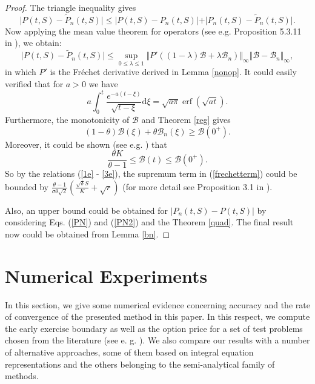 \documentclass[fleqn,final,3p,11pt]{elsarticle}
\theoremstyle{definition}
\theoremstyle{remark}
\numberwithin{equation}{section}
\DeclareMathOperator{\erf}{erf}
\begin{document}
\begin{proof}
The triangle inequality gives
\[
\vert P(t, S) - \tilde{P}_{n}(t, S) \vert \leq \vert P(t, S) - P_{n}(t, S) \vert + \vert P_{n}(t, S) - \tilde{P}_{n}(t, S) \vert.
 \]
Now applying the mean value theorem for operators (see e.g. Proposition 5.3.11 in \cite{atkinson}), we obtain:
 \begin{equation}\label{frechetterm}
 \vert P(t, S) - \tilde{P}_{n}(t, S) \vert\leq \sup_{0 \leq \lambda \leq 1} \Vert P'((1- \lambda)\mathcal{B} + \lambda \mathcal{B}_{n}) \Vert_{\infty} \Vert \mathcal{B} - \mathcal{B}_{n} \Vert_{\infty},\end{equation}
in which $P'$ is the Fr\'{e}chet derivative derived in Lemma \ref{nonop}.  It could easily verified that for $a> 0$ we have
\begin{equation}\label{1e} a \int_{0}^{t} \frac{e^{-a(t- \xi)}}{\sqrt{t -\xi}}\mathrm{d}\xi = \sqrt{a \pi} \erf (\sqrt{a t}).\end{equation}
Furthermore, the monotonicity of $\mathcal{B}$  and Theorem \ref{reg} gives
 \begin{equation}\label{2e} (1-\theta)\mathcal{B}(\xi) + \theta \mathcal{B}_{n}(\xi) \geq \mathcal{B}(0^{+}). \end{equation}
Moreover, it could be shown (see e.g. \cite{kim}) that
 \begin{equation}\label{3e}\frac{\theta K}{\theta -1 } \leq \mathcal{B}(t) \leq \mathcal{B}(0^{+}). \end{equation}
 So by the relations (\ref{1e} - \ref{3e}), the supremum term in (\ref{frechetterm}) could be bounded by $\frac{\theta -1}{\sigma \theta \sqrt{2}} \left( \frac{\sqrt{\delta}S}{K} + \sqrt{r}\right)$ (for more detail see Proposition 3.1 in \cite{heider2007condition}).

Also, an upper bound could be obtained for  $\vert P_{n}(t, S) - {P}(t, S) \vert$ by considering Eqs. (\ref{PN}) and (\ref{PN2}) and the  Theorem \ref{quad}. The final result now could be obtained from Lemma \ref{bn}.
\end{proof}
\section{Numerical Experiments}\label{NE}
In this section, we give some numerical evidence concerning accuracy and the rate of convergence of the presented method in this paper. In this respect, we compute the early exercise boundary as well as the option price for a set of test problems chosen from the literature (see e. g. \cite{ju, kallast}). We also compare our results with a number of alternative approaches, some of them based on integral equation representations and the others belonging to the semi-analytical family of methods.
\end{document}
